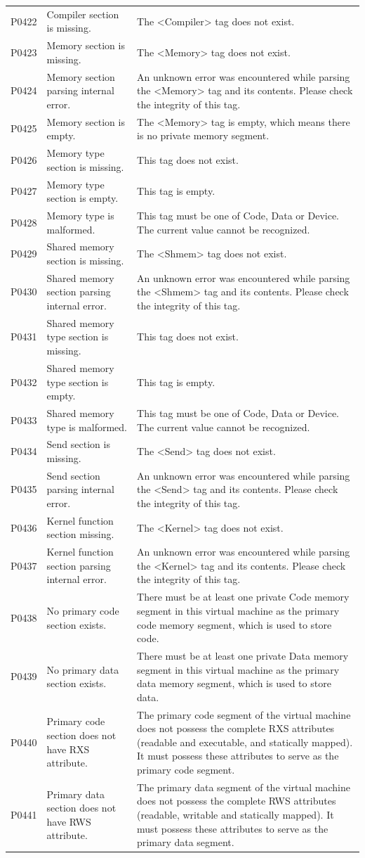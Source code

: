 \begin{xltabular}{\textwidth}{@{}>{\hsize\raggedright\arraybackslash}X>{\hsize\raggedright\arraybackslash}X>{\hsize\raggedright\arraybackslash}X@{}}
P0422 & Compiler section is missing. &
The <Compiler> tag does not exist.\tabularnewline
P0423 & Memory section is missing. &
The <Memory> tag does not exist.\tabularnewline
P0424 & Memory section parsing internal error. &
An unknown error was encountered while parsing the <Memory> tag and its contents. Please check the integrity of this tag.\tabularnewline
P0425 & Memory section is empty. &
The <Memory> tag is empty, which means there is no private memory segment.\tabularnewline
P0426 & Memory type section is missing. & This tag does not exist.\tabularnewline
P0427 & Memory type section is empty. & This tag is empty.\tabularnewline
P0428 & Memory type is malformed. & This tag must be one of Code, Data or Device. The current value cannot be recognized.\tabularnewline
P0429 & Shared memory section is missing. &
The <Shmem> tag does not exist.\tabularnewline
P0430 & Shared memory section parsing internal error. &
An unknown error was encountered while parsing the <Shmem> tag and its contents. Please check the integrity of this tag.\tabularnewline
P0431 & Shared memory type section is missing. & This tag does not exist.\tabularnewline
P0432 & Shared memory type section is empty. & This tag is empty.\tabularnewline
P0433 & Shared memory type is malformed. & This tag must be one of Code, Data or Device. The current value cannot be recognized.\tabularnewline
P0434 & Send section is missing. &
The <Send> tag does not exist.\tabularnewline
P0435 & Send section parsing internal error. &
An unknown error was encountered while parsing the <Send> tag and its contents. Please check the integrity of this tag.\tabularnewline
P0436 & Kernel function section missing. &
The <Kernel> tag does not exist.\tabularnewline
P0437 & Kernel function section parsing internal error. &
An unknown error was encountered while parsing the <Kernel> tag and its contents. Please check the integrity of this tag.\tabularnewline
P0438 & No primary code section exists. &
There must be at least one private Code memory segment in this virtual machine as the primary code memory segment, which is used to store code.\tabularnewline
P0439 & No primary data section exists. &
There must be at least one private Data memory segment in this virtual machine as the primary data memory segment, which is used to store data.\tabularnewline
P0440 & Primary code section does not have RXS attribute. &
The primary code segment of the virtual machine does not possess the complete RXS attributes (readable and executable, and statically mapped). It must possess these attributes to serve as the primary code segment.\tabularnewline
P0441 & Primary data section does not have RWS attribute. &
The primary data segment of the virtual machine does not possess the complete RWS attributes (readable, writable and statically mapped). It must possess these attributes to serve as the primary data segment.\tabularnewline
\end{xltabular}

